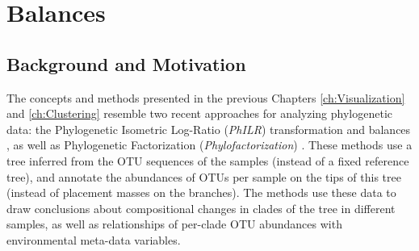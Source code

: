 
\chapter{Balances}
\label{ch:Balances}




\section{Background and Motivation}
\label{ch:Balances:sec:Motivation}



The concepts and methods presented in the previous Chapters \ref{ch:Visualization} and \ref{ch:Clustering} 
resemble two recent approaches for analyzing phylogenetic data:
the Phylogenetic Isometric Log-Ratio (\emph{PhILR}) transformation and balances \cite{Silverman2017},
as well as Phylogenetic Factorization (\emph{Phylofactorization}) \cite{Washburne2017a}.
These methods use a tree inferred from the OTU sequences of the samples (instead of a fixed reference tree),
and annotate the abundances of OTUs per sample on the tips of this tree (instead of placement masses on the branches).
The methods use these data to draw conclusions about compositional changes in clades of the tree in different samples,
as well as relationships of per-clade OTU abundances with environmental meta-data variables.


